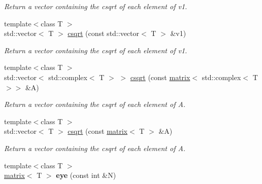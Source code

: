 \begin{DoxyCompactItemize}
\begin{DoxyCompactList}\small\item\em Return a vector containing the csqrt of each element of v1. \end{DoxyCompactList}\item 
\hypertarget{namespacekeycpp_a1e6c724d2e4067f9ae5fd3098da74bf6}{{\footnotesize template$<$class T $>$ }\\std\-::vector$<$ T $>$ \hyperlink{namespacekeycpp_a1e6c724d2e4067f9ae5fd3098da74bf6}{csqrt} (const std\-::vector$<$ T $>$ \&v1)}\label{namespacekeycpp_a1e6c724d2e4067f9ae5fd3098da74bf6}

\begin{DoxyCompactList}\small\item\em Return a vector containing the csqrt of each element of v1. \end{DoxyCompactList}\item 
\hypertarget{namespacekeycpp_a4ce9f002c4f3db2000a5c8d3a38f3ca5}{{\footnotesize template$<$class T $>$ }\\std\-::vector$<$ std\-::complex$<$ T $>$ $>$ \hyperlink{namespacekeycpp_a4ce9f002c4f3db2000a5c8d3a38f3ca5}{csqrt} (const \hyperlink{classkeycpp_1_1matrix}{matrix}$<$ std\-::complex$<$ T $>$$>$ \&A)}\label{namespacekeycpp_a4ce9f002c4f3db2000a5c8d3a38f3ca5}

\begin{DoxyCompactList}\small\item\em Return a vector containing the csqrt of each element of A. \end{DoxyCompactList}\item 
\hypertarget{namespacekeycpp_abe9f54061aba34fe730de8c35d68f9fe}{{\footnotesize template$<$class T $>$ }\\std\-::vector$<$ T $>$ \hyperlink{namespacekeycpp_abe9f54061aba34fe730de8c35d68f9fe}{csqrt} (const \hyperlink{classkeycpp_1_1matrix}{matrix}$<$ T $>$ \&A)}\label{namespacekeycpp_abe9f54061aba34fe730de8c35d68f9fe}

\begin{DoxyCompactList}\small\item\em Return a vector containing the csqrt of each element of A. \end{DoxyCompactList}\item 
\hypertarget{namespacekeycpp_a8ae33fb19a521ab1ec1f22e7c39ca076}{{\footnotesize template$<$class T $>$ }\\\hyperlink{classkeycpp_1_1matrix}{matrix}$<$ T $>$ {\bfseries eye} (const int \&N)}\label{namespacekeycpp_a8ae33fb19a521ab1ec1f22e7c39ca076}


\end{DoxyCompactItemize}
